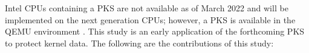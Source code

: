 
%
Intel CPUs containing a PKS are not available as of March 2022 and will be implemented
on the next generation CPUs; however, a PKS is available in the QEMU environment
\cite{qemu}.
%
This study is an early application of the forthcoming PKS to protect kernel
data.
%
The following are the contributions of this study:
%
%
% 

%







